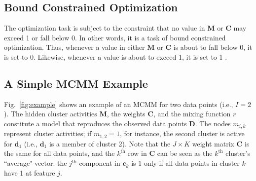  \subsection{Bound Constrained Optimization}
The optimization task is subject to the constraint %
that no value in $\mathbf{M}$ or $\mathbf{C}$ may exceed 1 or fall below 0. In other words,
it is a task of bound constrained optimization. Thus, whenever a value in either $\mathbf{M}$ or $\mathbf{C}$ is about
to fall below 0, it is set to 0. Likewise, whenever a value is about to exceed 1, it is set to 1
\citep{ni:yuan:1997}.
  

\subsection{A Simple MCMM Example}
\label{subsec:example}

Fig.~\ref{fig:example} shows an example of an MCMM for two data points (i.e., $I = 2$).
The hidden cluster activities $\mathbf{M}$, the weights $\mathbf{C}$,
and the mixing function $r$ constitute a model that reproduces the
observed data points $\mathbf{D}$.
%
%
The nodes $m_{i,k}$ represent cluster activities; if $m_{1,2} = 1$,
for instance, the second cluster is active for $\mathbf{d}_1$ (i.e.,
$\mathbf{d}_1$ is a member of cluster 2).
%
Note that the $J \times K$ weight matrix $\mathbf{C}$ is the same for
all data points, and
%
%
the $k^{\text{th}}$ row in $\mathbf{C}$ can be seen as the $k^{\text{th}}$
cluster's ``average" vector: the $j^{\text{th}}$ component in
$\mathbf{c}_k$ is 1 only if all data points in cluster $k$ have
1 at feature $j$.
%

